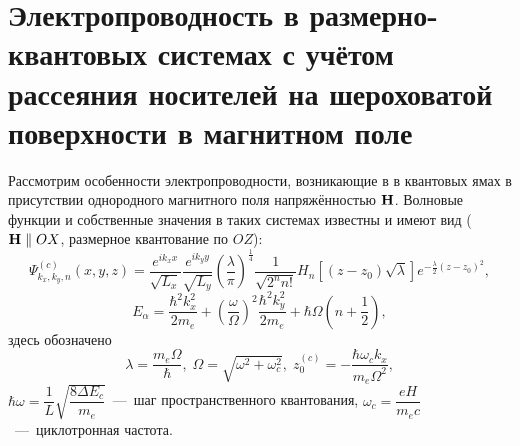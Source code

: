 \section{ Электропроводность в размерно-квантовых системах с учётом рассеяния носителей на шероховатой поверхности в магнитном поле}

Рассмотрим особенности электропроводности, возникающие в в квантовых ямах в присутствии однородного магнитного поля напряжённостью $\boldsymbol{\mathbf{H}}$. Волновые функции и собственные значения в таких системах известны \cite{Tavger1966} и имеют вид ($\boldsymbol{\mathbf{H}} \parallel OX$, размерное квантование по $OZ$):
\begin{equation} \label{eq:32_05_10}
\Psi^{(c)}_{k_x,k_y,n}(x,y,z)=\frac{e^{ik_x x}}{\sqrt{L_x}}\frac{e^{ik_y y}}{\sqrt{L_y}}{\left(\frac{\lambda }{\pi }\right)}^{\frac{1}{4}}\frac{1}{\sqrt{2^n n!}}H_n\left[(z-z_0)\sqrt{\lambda }\right]e^{-\frac{\lambda }{2}(z-z_0)^2},
\end{equation}
\begin{equation} \label{eq:32_05_20}
E_{\alpha }=\frac{{\hbar }^2 k^2_x}{2m_e}+{\left(\frac{\omega }{\Omega }\right)}^2\frac{\hbar^2 k^2_y}{2m_e} +\hbar\Omega \left(n+\frac{1}{2}\right),
\end{equation}
здесь обозначено
\[
\lambda =\frac{m_e\Omega }{\hbar },\;
\Omega =\sqrt{\omega^2+\omega^2_c},\;
z^{(c)}_0=-\frac{\hbar \omega_c k_x}{m_e \Omega^2},
\]
$\hbar \omega =\dfrac{1}{L} \sqrt{\dfrac{8\Delta E_c }{m_e}} $~---~шаг пространственного квантования,
$\omega_c=\dfrac{eH}{m_e c}$~---~циклотронная частота.

